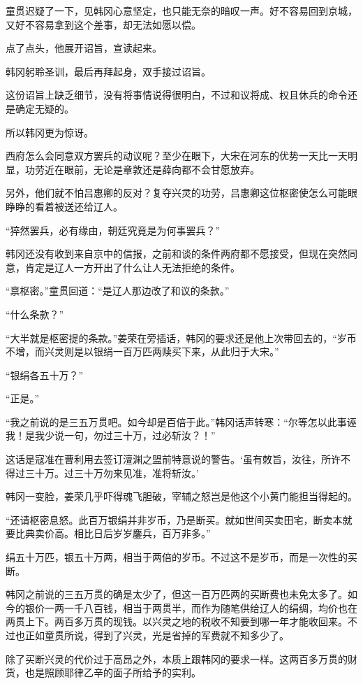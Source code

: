 童贯迟疑了一下，见韩冈心意坚定，也只能无奈的暗叹一声。好不容易回到京城，又好不容易拿到这个差事，却无法如愿以偿。

点了点头，他展开诏旨，宣读起来。

韩冈躬聆圣训，最后再拜起身，双手接过诏旨。

这份诏旨上缺乏细节，没有将事情说得很明白，不过和议将成、权且休兵的命令还是确定无疑的。

所以韩冈更为惊讶。

西府怎么会同意双方罢兵的动议呢？至少在眼下，大宋在河东的优势一天比一天明显，功劳近在眼前，无论是章敦还是薛向都不会甘愿放弃。

另外，他们就不怕吕惠卿的反对？复夺兴灵的功劳，吕惠卿这位枢密使怎么可能眼睁睁的看着被送还给辽人。

“猝然罢兵，必有缘由，朝廷究竟是为何事罢兵？”

韩冈还没有收到来自京中的信报，之前和谈的条件两府都不愿接受，但现在突然同意，肯定是辽人一方开出了什么让人无法拒绝的条件。

“禀枢密。”童贯回道：“是辽人那边改了和议的条款。”

“什么条款？”

“大半就是枢密提的条款。”姜荣在旁插话，韩冈的要求还是他上次带回去的，“岁币不增，而兴灵则是以银绢一百万匹两赎买下来，从此归于大宋。”

“银绢各五十万？”

“正是。”

“我之前说的是三五万贯吧。如今却是百倍于此。”韩冈话声转寒：“尔等怎以此事诬我！是我少说一句，勿过三十万，过必斩汝？！”

这话是寇准在曹利用去签订澶渊之盟前特意说的警告。‘虽有敇旨，汝往，所许不得过三十万。过三十万勿来见准，准将斩汝。’

韩冈一变脸，姜荣几乎吓得魂飞胆破，宰辅之怒岂是他这个小黄门能担当得起的。

“还请枢密息怒。此百万银绢并非岁币，乃是断买。就如世间买卖田宅，断卖本就要比典卖价高。相比日后岁岁鏖兵，百万非多。”

绢五十万匹，银五十万两，相当于两倍的岁币。不过这不是岁币，而是一次性的买断。

韩冈之前说的三五万贯的确是太少了，但这一百万匹两的买断费也未免太多了。如今的银价一两一千八百钱，相当于两贯半，而作为随笔供给辽人的绢绸，均价也在两贯上下。两百多万贯的现钱。以兴灵之地的税收不知要到哪一年才能收回来。不过也正如童贯所说，得到了兴灵，光是省掉的军费就不知多少了。

除了买断兴灵的代价过于高昂之外，本质上跟韩冈的要求一样。这两百多万贯的财货，也是照顾耶律乙辛的面子所给予的实利。

